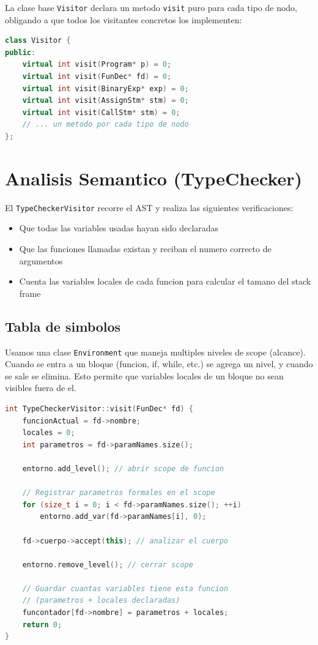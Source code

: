 \documentclass[12pt, a4paper]{article}
\begin{document}
La clase base \texttt{Visitor} declara un metodo \texttt{visit} puro para cada tipo de nodo, obligando a que todos los visitantes concretos los implementen:

\begin{lstlisting}[language=C++, style=cppstyle, caption={Interfaz del Visitor}]
class Visitor {
public:
    virtual int visit(Program* p) = 0;
    virtual int visit(FunDec* fd) = 0;
    virtual int visit(BinaryExp* exp) = 0;
    virtual int visit(AssignStm* stm) = 0;
    virtual int visit(CallStm* stm) = 0;
    // ... un metodo por cada tipo de nodo
};
\end{lstlisting}

\newpage

\section{Analisis Semantico (TypeChecker)}

El \texttt{TypeCheckerVisitor} recorre el AST y realiza las siguientes verificaciones:

\begin{itemize}
    \item Que todas las variables usadas hayan sido declaradas
    \item Que las funciones llamadas existan y reciban el numero correcto de argumentos
    \item Cuenta las variables locales de cada funcion para calcular el tamano del stack frame
\end{itemize}

\subsection{Tabla de simbolos}

Usamos una clase \texttt{Environment} que maneja multiples niveles de scope (alcance). Cuando se entra a un bloque (funcion, if, while, etc.) se agrega un nivel, y cuando se sale se elimina. Esto permite que variables locales de un bloque no sean visibles fuera de el.

\begin{lstlisting}[language=C++, style=cppstyle, caption={Manejo de scopes en el TypeChecker}]
int TypeCheckerVisitor::visit(FunDec* fd) {
    funcionActual = fd->nombre;
    locales = 0;
    int parametros = fd->paramNames.size();

    entorno.add_level(); // abrir scope de funcion

    // Registrar parametros formales en el scope
    for (size_t i = 0; i < fd->paramNames.size(); ++i)
        entorno.add_var(fd->paramNames[i], 0);

    fd->cuerpo->accept(this); // analizar el cuerpo

    entorno.remove_level(); // cerrar scope

    // Guardar cuantas variables tiene esta funcion
    // (parametros + locales declaradas)
    funcontador[fd->nombre] = parametros + locales;
    return 0;
}
\end{lstlisting}
\end{document}
